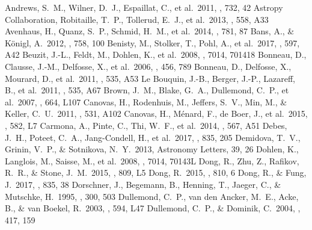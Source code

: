 \documentclass[twocolumn,tighten]{aastex61}
\begin{document}
\begin{thebibliography}{}

 Andrews, S.~M., Wilner, D.~J., Espaillat, C., et al.\ 2011, \apj, 732, 42
 Astropy Collaboration, Robitaille, T.~P., Tollerud, E.~J., et al.\ 2013, \aap, 558, A33
 Avenhaus, H., Quanz, S.~P., Schmid, H.~M., et al.\ 2014, \apj, 781, 87
 Bans, A., \& K{\"o}nigl, A.\ 2012, \apj, 758, 100
 Benisty, M., Stolker, T., Pohl, A., et al.\ 2017, \aap, 597, A42
 Beuzit, J.-L., Feldt, M., Dohlen, K., et al.\ 2008, \procspie, 7014, 701418
 Bonneau, D., Clausse, J.-M., Delfosse, X., et al.\ 2006, \aap, 456, 789
 Bonneau, D., Delfosse, X., Mourard, D., et al.\ 2011, \aap, 535, A53
 Le Bouquin, J.-B., Berger, J.-P., Lazareff, B., et al.\ 2011, \aap, 535, A67
 Brown, J.~M., Blake, G.~A., Dullemond, C.~P., et al.\ 2007, \apjl, 664, L107
 Canovas, H., Rodenhuis, M., Jeffers, S.~V., Min, M., \& Keller, C.~U.\ 2011, \aap, 531, A102
 Canovas, H., M{\'e}nard, F., de Boer, J., et al.\ 2015, \aap, 582, L7
 Carmona, A., Pinte, C., Thi, W.~F., et al.\ 2014, \aap, 567, A51
 Debes, J.~H., Poteet, C.~A., Jang-Condell, H., et al.\ 2017, \apj, 835, 205
 Demidova, T.~V., Grinin, V.~P., \& Sotnikova, N.~Y.\ 2013, Astronomy Letters, 39, 26
 Dohlen, K., Langlois, M., Saisse, M., et al.\ 2008, \procspie, 7014, 70143L
 Dong, R., Zhu, Z., Rafikov, R.~R., \& Stone, J.~M.\ 2015, \apjl, 809, L5
 Dong, R.\ 2015, \apj, 810, 6
 Dong, R., \& Fung, J.\ 2017, \apj, 835, 38
 Dorschner, J., Begemann, B., Henning, T., Jaeger, C., \& Mutschke, H.\ 1995, \aap, 300, 503
 Dullemond, C.~P., van den Ancker, M.~E., Acke, B., \& van Boekel, R.\ 2003, \apjl, 594, L47
 Dullemond, C.~P., \& Dominik, C.\ 2004, \aap, 417, 159

\end{thebibliography}
\end{document}

